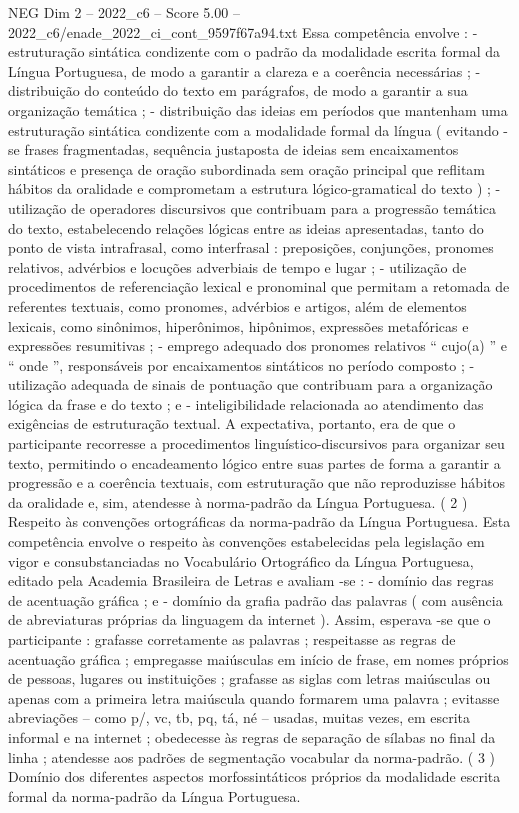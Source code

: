 \begin{textsample}{NEG Dim 2 – 2022\_c6 – Score 5.00 – 2022\_c6/enade\_2022\_ci\_cont\_9597f67a94.txt}
Essa competência envolve : - estruturação sintática condizente com o padrão da modalidade escrita formal da Língua Portuguesa, de modo a garantir a clareza e a coerência necessárias ; - distribuição do conteúdo do texto em parágrafos, de modo a garantir a sua organização temática ; - distribuição das ideias em períodos que mantenham uma estruturação sintática condizente com a modalidade formal da língua ( evitando -se frases fragmentadas, sequência justaposta de ideias sem encaixamentos sintáticos e presença de oração subordinada sem oração principal que reflitam hábitos da oralidade e comprometam a estrutura lógico-gramatical do texto ) ; - utilização de operadores discursivos que contribuam para a progressão temática do texto, estabelecendo relações lógicas entre as ideias apresentadas, tanto do ponto de vista intrafrasal, como interfrasal : preposições, conjunções, pronomes relativos, advérbios e locuções adverbiais de tempo e lugar ; - utilização de procedimentos de referenciação lexical e pronominal que permitam a retomada de referentes textuais, como pronomes, advérbios e artigos, além de elementos lexicais, como sinônimos, hiperônimos, hipônimos, expressões metafóricas e expressões resumitivas ; - emprego adequado dos pronomes relativos “ cujo(a) ” e “ onde ”, responsáveis por encaixamentos sintáticos no período composto ; - utilização adequada de sinais de pontuação que contribuam para a organização lógica da frase e do texto ; e - inteligibilidade relacionada ao atendimento das exigências de estruturação textual.
A expectativa, portanto, era de que o participante recorresse a procedimentos linguístico-discursivos para organizar seu texto, permitindo o encadeamento lógico entre suas partes de forma a garantir a progressão e a coerência textuais, com estruturação que não reproduzisse hábitos da oralidade e, sim, atendesse à norma-padrão da Língua Portuguesa. ( 2 ) Respeito às convenções ortográficas da norma-padrão da Língua Portuguesa.
Esta competência envolve o respeito às convenções estabelecidas pela legislação em vigor e consubstanciadas no Vocabulário Ortográfico da Língua Portuguesa, editado pela Academia Brasileira de Letras e avaliam -se : - domínio das regras de acentuação gráfica ; e - domínio da grafia padrão das palavras ( com ausência de abreviaturas próprias da linguagem da internet ).
Assim, esperava -se que o participante : grafasse corretamente as palavras ; respeitasse as regras de acentuação gráfica ; empregasse maiúsculas em início de frase, em nomes próprios de pessoas, lugares ou instituições ; grafasse as siglas com letras maiúsculas ou apenas com a primeira letra maiúscula quando formarem uma palavra ; evitasse abreviações – como p/, vc, tb, pq, tá, né – usadas, muitas vezes, em escrita informal e na internet ; obedecesse às regras de separação de sílabas no final da linha ; atendesse aos padrões de segmentação vocabular da norma-padrão. ( 3 ) Domínio dos diferentes aspectos morfossintáticos próprios da modalidade escrita formal da norma-padrão da Língua Portuguesa.

\end{textsample}
